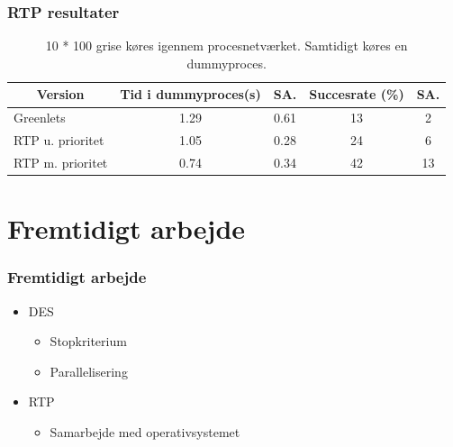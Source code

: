 \documentclass[12pt]{beamer}
\newcommand\mc[1]{\multicolumn{1}{c}{\textbf {#1}}} %
\begin{document}
\begin{frame}
  	\frametitle{RTP resultater}
	\tiny 
	\begin{table}[htbp]
		\centering
		\begin{tabular}{lcccc}
		   	\toprule
		    \mc{Version}&\mc{Tid i dummyproces(s)}&\mc{SA.}& \mc{Succesrate (\%)}&\mc{SA.}\\
		    \midrule
		    Greenlets         & 1.29 & 0.61 & 13 & 2  \\
		    RTP u. prioritet  & 1.05 & 0.28 & 24 & 6  \\
		    RTP m. prioritet  & 0.74 & 0.34 & 42 & 13 \\
		    \bottomrule
		\end{tabular}
		\caption[]{\tiny 10 * 100 grise køres igennem procesnetværket. Samtidigt køres en dummyproces.}
	\end{table}
\end{frame} 

\section{Fremtidigt arbejde}
\begin{frame}
  	\frametitle{Fremtidigt arbejde}
\begin{itemize}
\item DES
	\begin{itemize}
	\item Stopkriterium
	\item Parallelisering
	\end{itemize}
\item RTP
	\begin{itemize}
	\item Samarbejde med operativsystemet
	\end{itemize}
\end{itemize}
\end{frame}
 




\end{document}
